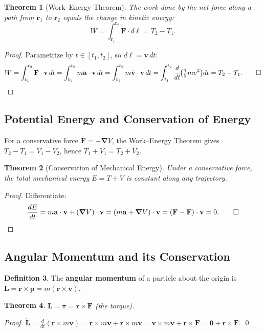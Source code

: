 \documentclass[12pt,a4paper]{article}
\theoremstyle{plain}
\newtheorem{theorem}{Theorem}[section]
\theoremstyle{definition}
\newtheorem{definition}[theorem]{Definition}
\theoremstyle{remark}
\newcommand{\ve}[1]{\mathbf{#1}}           %
\newcommand{\Lv}{\ve{L}}
\newcommand{\Fv}{\ve{F}}
\newcommand{\rv}{\ve{r}}
\newcommand{\vv}{\ve{v}}
\newcommand{\av}{\ve{a}}
\newcommand{\pv}{\ve{p}}
\newcommand{\nab}{\boldsymbol{\nabla}}
\begin{document}
\begin{theorem}[Work--Energy Theorem]\label{thm:WET}
The work done by the net force along a path from $\rv_1$ to $\rv_2$ equals the change in kinetic energy:
\[
  W = \int_{\rv_1}^{\rv_2}\Fv\cdot d\boldsymbol\ell = T_2 - T_1.
\]
\end{theorem}
\begin{proof}
Parametrize by $t\in[t_1,t_2]$, so $d\boldsymbol\ell = \vv\,dt$:
\[
  W = \int_{t_1}^{t_2}\Fv\cdot\vv\,dt
    = \int_{t_1}^{t_2}m\av\cdot\vv\,dt
    = \int_{t_1}^{t_2}m\dot{\vv}\cdot\vv\,dt
    = \int_{t_1}^{t_2}\frac{d}{dt}\!\bigl(\tfrac{1}{2}mv^2\bigr)dt
    = T_2 - T_1. \qed
\]
\end{proof}

\subsection{Potential Energy and Conservation of Energy}

For a conservative force $\Fv = -\nab V$, the Work--Energy Theorem gives $T_2-T_1 = V_1-V_2$, hence $T_1+V_1 = T_2+V_2$.

\begin{theorem}[Conservation of Mechanical Energy]\label{thm:energy}
Under a conservative force, the total mechanical energy $E = T + V$ is constant along any trajectory.
\end{theorem}
\begin{proof}
Differentiate:
\[
  \frac{dE}{dt}
  = m\av\cdot\vv + (\nab V)\cdot\vv
  = (m\av + \nab V)\cdot\vv
  = (\Fv - \Fv)\cdot\vv = 0. \qed
\]
\end{proof}

\subsection{Angular Momentum and its Conservation}

\begin{definition}
The \textbf{angular momentum} of a particle about the origin is $\Lv = \rv\times\pv = m(\rv\times\vv)$.
\end{definition}

\begin{theorem}\label{thm:torque}
$\dot{\Lv} = \boldsymbol{\tau} = \rv\times\Fv$ (the torque).
\end{theorem}
\begin{proof}
$\dot{\Lv} = \frac{d}{dt}(\rv\times m\vv) = \dot{\rv}\times m\vv + \rv\times m\dot{\vv} = \vv\times m\vv + \rv\times\Fv = \ve{0} + \rv\times\Fv$. \qed
\end{proof}
\end{document}
